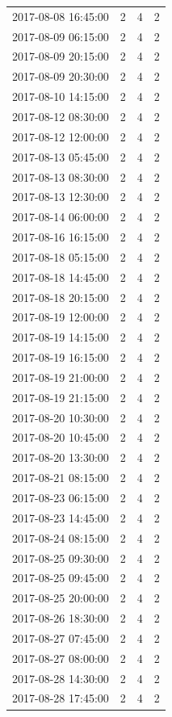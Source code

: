 \begin{tabular}{lrrr}
2017-08-08 16:45:00 & 2 & 4 & 2 \\
2017-08-09 06:15:00 & 2 & 4 & 2 \\
2017-08-09 20:15:00 & 2 & 4 & 2 \\
2017-08-09 20:30:00 & 2 & 4 & 2 \\
2017-08-10 14:15:00 & 2 & 4 & 2 \\
2017-08-12 08:30:00 & 2 & 4 & 2 \\
2017-08-12 12:00:00 & 2 & 4 & 2 \\
2017-08-13 05:45:00 & 2 & 4 & 2 \\
2017-08-13 08:30:00 & 2 & 4 & 2 \\
2017-08-13 12:30:00 & 2 & 4 & 2 \\
2017-08-14 06:00:00 & 2 & 4 & 2 \\
2017-08-16 16:15:00 & 2 & 4 & 2 \\
2017-08-18 05:15:00 & 2 & 4 & 2 \\
2017-08-18 14:45:00 & 2 & 4 & 2 \\
2017-08-18 20:15:00 & 2 & 4 & 2 \\
2017-08-19 12:00:00 & 2 & 4 & 2 \\
2017-08-19 14:15:00 & 2 & 4 & 2 \\
2017-08-19 16:15:00 & 2 & 4 & 2 \\
2017-08-19 21:00:00 & 2 & 4 & 2 \\
2017-08-19 21:15:00 & 2 & 4 & 2 \\
2017-08-20 10:30:00 & 2 & 4 & 2 \\
2017-08-20 10:45:00 & 2 & 4 & 2 \\
2017-08-20 13:30:00 & 2 & 4 & 2 \\
2017-08-21 08:15:00 & 2 & 4 & 2 \\
2017-08-23 06:15:00 & 2 & 4 & 2 \\
2017-08-23 14:45:00 & 2 & 4 & 2 \\
2017-08-24 08:15:00 & 2 & 4 & 2 \\
2017-08-25 09:30:00 & 2 & 4 & 2 \\
2017-08-25 09:45:00 & 2 & 4 & 2 \\
2017-08-25 20:00:00 & 2 & 4 & 2 \\
2017-08-26 18:30:00 & 2 & 4 & 2 \\
2017-08-27 07:45:00 & 2 & 4 & 2 \\
2017-08-27 08:00:00 & 2 & 4 & 2 \\
2017-08-28 14:30:00 & 2 & 4 & 2 \\
2017-08-28 17:45:00 & 2 & 4 & 2 \\

\end{tabular}
